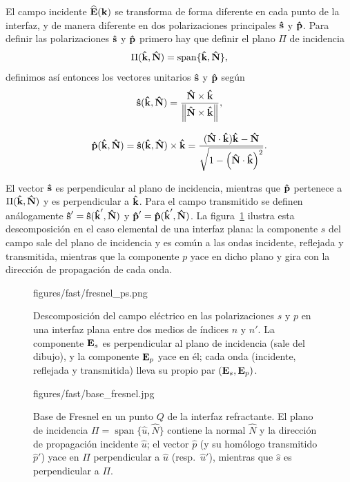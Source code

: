El campo incidente $\widehat{\vb E}(\vb k)$ se transforma de forma diferente en cada punto de la interfaz, y de manera diferente en dos polarizaciones principales $\bm{\hat{\mathbf{s}}}$ y $\bm{\hat{\mathbf{p}}}$.
Para definir las polarizaciones $\bm{\hat{\mathbf{s}}}$ y $\bm{\hat{\mathbf{p}}}$ primero hay que definir el plano $\Pi$ de incidencia
\begin{equation}
\Pi(\bm{\hat{\mathbf{k}}},\bm{\hat{\mathbf{N}}}) = \operatorname{span}\{\bm{\hat{\mathbf{k}}}, \bm{\hat{\mathbf{N}}}\},
\label{eq:pi}
\end{equation}
definimos así entonces los vectores unitarios $\bm{\hat{\mathbf{s}}}$ y $\bm{\hat{\mathbf{p}}}$ según
\begin{equation}
  \bm{\hat{\mathbf{s}}}(\bm{\hat{\mathbf{k}}},\bm{\hat{\mathbf{N}}})
  = \frac{\bm{\hat{\mathbf{N}}}\times\bm{\hat{\mathbf{k}}}}
  {\left\|\bm{\hat{\mathbf{N}}}\times\bm{\hat{\mathbf{k}}}\right\|},
\label{eq:sdef}
\end{equation}

\begin{equation}
  \bm{\hat{\mathbf{p}}}(\bm{\hat{\mathbf{k}}},\bm{\hat{\mathbf{N}}})
  = \bm{\hat{\mathbf{s}}}(\bm{\hat{\mathbf{k}}},\bm{\hat{\mathbf{N}}})\times\bm{\hat{\mathbf{k}}}
  = \frac{(\bm{\hat{\mathbf{N}}}\cdot\bm{\hat{\mathbf{k}}})\bm{\hat{\mathbf{k}}}-\bm{\hat{\mathbf{N}}}}
  {\sqrt{1-\left(\bm{\hat{\mathbf{N}}}\cdot\bm{\hat{\mathbf{k}}}\right)^2}}.
\label{eq:pdef}
\end{equation}

El vector $\bm{\hat{\mathbf{s}}}$ es perpendicular al plano de incidencia, mientras que $\bm{\hat{\mathbf{p}}}$ pertenece a $\Pi(\bm{\hat{\mathbf{k}}},\bm{\hat{\mathbf{N}}})$ y es perpendicular a $\bm{\hat{\mathbf{k}}}$. Para el campo transmitido se definen análogamente $\bm{\hat{\mathbf{s}}}'=\bm{\hat{\mathbf{s}}}(\bm{\hat{\mathbf{k}}}',\bm{\hat{\mathbf{N}}})$ y $\bm{\hat{\mathbf{p}}}'=\bm{\hat{\mathbf{p}}}(\bm{\hat{\mathbf{k}}}',\bm{\hat{\mathbf{N}}})$. La figura~\ref{fig:fresnel_sp_interface} ilustra esta descomposición en el caso elemental de una interfaz plana: la componente $s$ del campo sale del plano de incidencia y es común a las ondas incidente, reflejada y transmitida, mientras que la componente $p$ yace en dicho plano y gira con la dirección de propagación de cada onda.

\begin{figure}[H]
  \centering
    {figures/fast/fresnel_ps.png}
  \caption{Descomposición del campo eléctrico en las polarizaciones $s$ y $p$ en una interfaz plana entre dos medios de índices $n$ y $n'$. La componente $\vb E_s$ es perpendicular al plano de incidencia (sale del dibujo), y la componente $\vb E_p$ yace en él; cada onda (incidente, reflejada y transmitida) lleva su propio par $(\vb E_s, \vb E_p)$.}
  \label{fig:fresnel_sp_interface}
\end{figure}

\begin{figure}[H]
  \centering
    {figures/fast/base_fresnel.jpg}
  \caption{Base de Fresnel en un punto $Q$ de la interfaz refractante. El plano de incidencia $\Pi = \operatorname{span}\{\hat{u}, \hat{N}\}$ contiene la normal $\hat{N}$ y la dirección de propagación incidente $\hat{u}$; el vector $\hat{p}$ (y su homólogo transmitido $\hat{p}'$) yace en $\Pi$ perpendicular a $\hat{u}$ (resp.\ $\hat{u}'$), mientras que $\hat{s}$ es perpendicular a $\Pi$.}
  \label{fig:fresnel_basis}
\end{figure}

